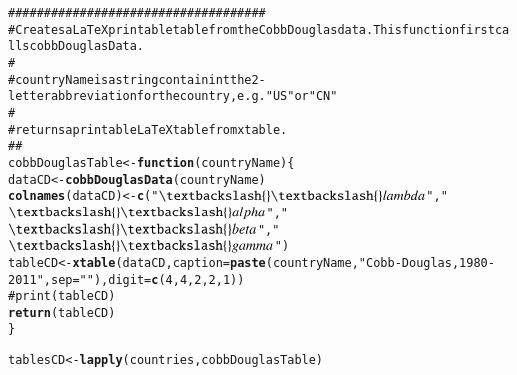 \documentclass[preprint,authoryear,12pt]{elsarticle}\usepackage{graphicx, color}
\makeatletter
\newcommand{\hlfunctioncall}[1]{\textcolor[rgb]{0.501960784313725,0,0.329411764705882}{\textbf{#1}}}%
\newcommand{\hlstring}[1]{\textcolor[rgb]{0.6,0.6,1}{#1}}%
\newcommand{\hlcomment}[1]{\textcolor[rgb]{0.180392156862745,0.6,0.341176470588235}{#1}}%
\newenvironment{kframe}{%
 \def\at@end@of@kframe{}%
 \ifinner\ifhmode%
  \def\at@end@of@kframe{\end{minipage}}%
  \begin{minipage}{\columnwidth}%
 \fi\fi%
 \def\FrameCommand##1{\hskip\@totalleftmargin \hskip-\fboxsep
 \colorbox{shadecolor}{##1}\hskip-\fboxsep
     \hskip-\linewidth \hskip-\@totalleftmargin \hskip\columnwidth}%
 \MakeFramed {\advance\hsize-\width
   \@totalleftmargin\z@ \linewidth\hsize
   \@setminipage}}%
 {\par\unskip\endMakeFramed%
 \at@end@of@kframe}
\newenvironment{knitrout}{}{} %
\makeatother
\begin{document}
\begin{knitrout}
\begin{kframe}
\begin{alltt}
\hlcomment{####################################}
\hlcomment{# Creates a LaTeX printable table from the Cobb Douglas data. This function first calls cobbDouglasData.}
\hlcomment{#}
\hlcomment{# countryName is a string containint the 2-letter abbreviation for the country, e.g. "US" or "CN"}
\hlcomment{#}
\hlcomment{# returns a printable LaTeX table from xtable.}
\hlcomment{##}
cobbDouglasTable <- \hlfunctioncall{function}(countryName)\{
  dataCD <- \hlfunctioncall{cobbDouglasData}(countryName) 
  \hlfunctioncall{colnames}(dataCD) <- \hlfunctioncall{c}(\hlstring{"$\textbackslash{}\textbackslash{}lambda$"}, \hlstring{"$\textbackslash{}\textbackslash{}alpha$"}, \hlstring{"$\textbackslash{}\textbackslash{}beta$"}, \hlstring{"$\textbackslash{}\textbackslash{}gamma$"})
  tableCD <- \hlfunctioncall{xtable}(dataCD, caption=\hlfunctioncall{paste}(countryName, \hlstring{" Cobb-Douglas, 1980-2011"}, sep=\hlstring{""}), digit = \hlfunctioncall{c}(4, 4, 2, 2, 1))
\hlcomment{  #print(tableCD)}
  \hlfunctioncall{return}(tableCD)  
\}
\end{alltt}
\end{kframe}
\end{knitrout}


\begin{knitrout}
\color{fgcolor}\begin{kframe}
\begin{alltt}
tablesCD <- \hlfunctioncall{lapply}(countries, cobbDouglasTable)
\end{alltt}


{\ttfamily\noindent\itshape\color{messagecolor}{Waiting for profiling to be done...}}

{\ttfamily\noindent\bfseries\color{errorcolor}{Error: could not find function "deltaMethod"}}\end{kframe}
\end{knitrout}
\end{document}
